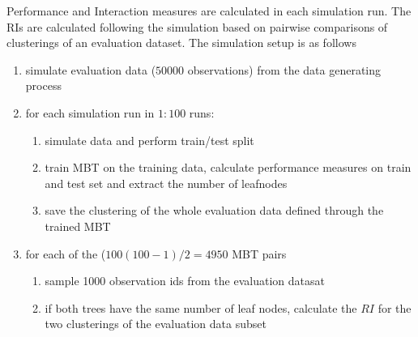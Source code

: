 Performance and Interaction measures are calculated in each simulation run.  
The RIs are calculated following the simulation based on pairwise comparisons of clusterings of an evaluation dataset. The simulation setup is as follows

\begin{enumerate}
    \item simulate evaluation data ($50000$ observations) from the data generating process
    \item for each simulation run in $1:100$ runs:
    \begin{enumerate}
        \item simulate data and perform train/test split
        \item train MBT on the training data, calculate performance measures on train and test set and extract the number of leafnodes
        \item save the clustering of the whole evaluation data defined through the trained MBT
    \end{enumerate}
    \item for each of the ($100(100-1)/2 = 4950$ MBT pairs
    \begin{enumerate}
        \item sample 1000 observation ids from the evaluation datasat
        \item if both trees have the same number of leaf nodes, calculate the $RI$ for the two clusterings of the evaluation data subset
    \end{enumerate}
\end{enumerate}


